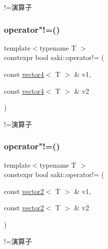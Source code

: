 !=演算子 

\mbox{\label{namespacesaki_a6805502ef12cd12f6be61a958fd35aa7}} 
\subsubsection{\texorpdfstring{operator"!=()}{operator!=()}\hspace{0.1cm}{\footnotesize\ttfamily [4/11]}}
{\footnotesize\ttfamily template$<$typename T $>$ \\
constexpr bool saki\+::operator!= (\begin{DoxyParamCaption}\item[{const \mbox{\hyperlink{classsaki_1_1vector4}{vector4}}$<$ T $>$ \&}]{v1,  }\item[{const \mbox{\hyperlink{classsaki_1_1vector4}{vector4}}$<$ T $>$ \&}]{v2 }\end{DoxyParamCaption})}



!=演算子 

\mbox{\label{namespacesaki_ac0c806d3237b6718e95e9b71f838bcc1}} 
\subsubsection{\texorpdfstring{operator"!=()}{operator!=()}\hspace{0.1cm}{\footnotesize\ttfamily [5/11]}}
{\footnotesize\ttfamily template$<$typename T $>$ \\
constexpr bool saki\+::operator!= (\begin{DoxyParamCaption}\item[{const \mbox{\hyperlink{classsaki_1_1vector2}{vector2}}$<$ T $>$ \&}]{v1,  }\item[{const \mbox{\hyperlink{classsaki_1_1vector2}{vector2}}$<$ T $>$ \&}]{v2 }\end{DoxyParamCaption})}



!=演算子 

\mbox{\label{namespacesaki_abacbb997c38e24f818c0b63d26267aa3}} 
